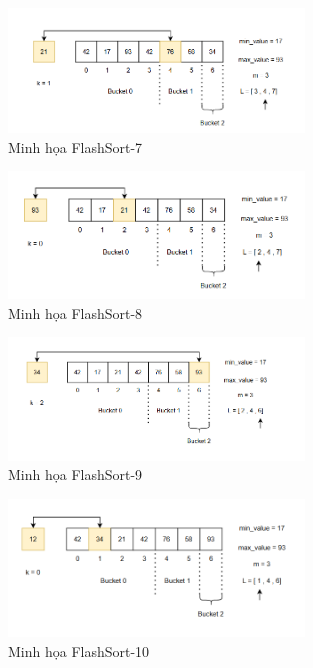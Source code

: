 \begin{enumerate}
    \begin{figure}[H]
        \centering
        \includegraphics[width=0.7\textwidth]{img/flash_sort/7.png}
        \caption{Minh họa FlashSort-7}
    \end{figure}
    
    \begin{figure}[H]
        \centering
        \includegraphics[width=0.7\textwidth]{img/flash_sort/8.png}
        \caption{Minh họa FlashSort-8}
    \end{figure}
    
    \begin{figure}[H]
        \centering
        \includegraphics[width=0.7\textwidth]{img/flash_sort/9.png}
        \caption{Minh họa FlashSort-9}
    \end{figure}
    
    \begin{figure}[H]
        \centering
        \includegraphics[width=0.7\textwidth]{img/flash_sort/10.png}
        \caption{Minh họa FlashSort-10}
    \end{figure}


\end{enumerate}
